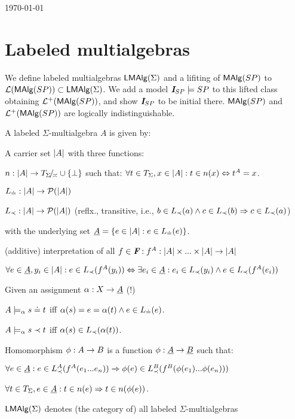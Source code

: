 \documentclass[12pt]{article}
\begin{document}
 

\hfill\today
% 
\section{Labeled multialgebras}
We define labeled multialgebras ${\sf LMAlg}(\Sigma)$ and a lifiting of ${\sf MAlg}(SP)$ to
${\cal L}({\sf MAlg}(SP))\subset{\sf LMAlg}(\Sigma)$. We add a model $\mbox{\bf{\em I}}_{SP}\models SP$ to
this lifted class obtaining ${\cal L}^+({\sf MAlg}(SP))$, and show $\mbox{\bf{\em I}}_{SP}$ to be initial
there. ${\sf MAlg}(SP)$ and ${\cal L}^+({\sf MAlg}(SP))$ are logically indistinguishable.
\begin{Definition}\label{de:lm}
A labeled $\Sigma$-multialgebra $A$ is given by:
\begin{enum}
\item A carrier set $|A|$ with three functions:
 \begin{enum}
 \item\label{addB} $n:|A|\rightarrow T_{\Sigma}\!{\textstyle /}\!_{\asymp} \cup\{\bot\}$ %
  such that: $\forall t\in T_{\Sigma}, x\in|A| : t\in  n(x) \Leftrightarrow t^A=x$.
 \item $L_{\mathrel{\dot{=} }}: |A| \rightarrow {\mathcal{P}}(|A|)$
 \item $L_{\prec}: |A| \rightarrow {\mathcal{P}}(|A|)$ (reflx., transitive, i.e.,  $b\in L_{\prec}(a)\land 
 c\in L_{\prec}(b) \Rightarrow c \in L_{\prec}(a)$)
 \end{enum}
with the underlying set $\underline {A} =\{e\in |A|: e\in L_{\mathrel{\dot{=} }}(e)\}$.
\item (additive) interpretation of all $f\in\mbox{\bf{\em F}}: f^A:|A|\times...\times|A|\rightarrow
|A|$
\begin{enum}
\item\label{addA} $\forall e \in\underline {A}, y_i\in|A|: e \in L_{\prec}(f^A(y_i)) \Leftrightarrow
\exists e_i\in\underline {A}: e_i\in L_{\prec}(y_i)\land e \in L_{\prec}(f^A(e_i))$
\end{enum}
\item Given an assignment $\alpha:X\rightarrow\underline {A}$ (!)
\begin{enum}
\item $A\models_\alpha s\mathrel{\dot{=} } t$ iff $\alpha(s)=e = \alpha(t) \land e \in
L_{\mathrel{\dot{=} }}(e)$.
\item
$A\models_\alpha s\prec t$ iff $\alpha(s) \in L_{\prec}(\alpha(t))$.
\end{enum}
\item Homomorphism 
$\phi:A\rightarrow B$ is a function $\phi:\underline {A}\rightarrow \underline {B}$ such that:
\begin{enum}
\item\label{*} $\forall e \in \underline {A} : e \in L_{\prec}^A(f^A(e_1...e_n))
\Rightarrow \phi(e) \in L_{\prec}^B(f^B(\phi(e_1)...\phi(e_n)))$
\item\label{**} $\forall t\in T_{\Sigma}, e \in\underline {A}: t\in n(e) \Rightarrow
t\in n(\phi(e))$.
\end{enum}
\item ${\sf LMAlg}(\Sigma)$ denotes (the category of) all labeled $\Sigma$-multialgebras 
\end{enum}
\end{Definition}
\end{document}
